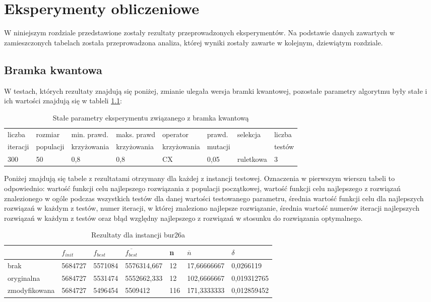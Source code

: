 \chapter{Eksperymenty obliczeniowe}
\label{cha:eksperymenty}
W niniejszym rozdziale przedstawione zostały rezultaty przeprowadzonych eksperymentów. Na podstawie danych zawartych w zamieszczonych tabelach została przeprowadzona analiza, której wyniki zostały zawarte w kolejnym, dziewiątym rozdziale.

\section{Bramka kwantowa}
W testach, których rezultaty znajdują się poniżej, zmianie ulegała wersja bramki kwantowej, pozostałe parametry algorytmu były stałe i ich wartości znajdują się w tableli \ref{T1_params}:

\begin{table}[H]
\label{T1_params}
\begin{tabular}{l l l l l l l l}
\hline
liczba & rozmiar & min. prawd. & maks. prawd & operator & prawd. & selekcja & liczba \\
iteracji & populacji & krzyżowania & krzyżowania & krzyżowania & mutacji & & testów \\
\hline
300 & 50 & 0,8 & 0,8 & CX & 0,05 & ruletkowa & 3 \\
\hline
\end{tabular}
\caption{Stałe parametry eksperymentu związanego z bramka kwantową}
\end{table}

Poniżej znajdują się tabele z rezultatami otrzymany dla każdej z instancji testowej. Oznaczenia w pierwszym wierszu tabeli to odpowiednio: wartość funkcji celu najlepszego rozwiązania z populacji początkowej, wartość funkcji celu najlepszego z rozwiązań znalezionego w ogóle podczas wszystkich testów dla danej wartości testowanego parametru, średnia wartość funkcji celu dla najlepszych rozwiązań w każdym z testów, numer iteracji, w której znaleziono najlepsze rozwiązanie, średnia wartość numerów iteracji najlepszych rozwiązań w każdym z testów oraz błąd względny najlepszego z rozwiązań w stosunku do rozwiązania optymalnego.

\begin{table}[H]
\label{T1_bur26a}
\begin{tabular}{l l l l l l l}
\hline
 & $f_{init}$ & $f_{best}$ & $\overline{f_{best}}$ & n & $\overline{n}$ & $\delta$ \\
\hline
brak & 5684727 & 5571084 & 5576314,667 & 12 & 17,66666667 & 0,0266119 \\
oryginalna & 5684727 & 5531474 & 5552662,333 & 12 & 102,6666667 & 0,019312765 \\
zmodyfikowana & 5684727 & 5496454 & 5509412 & 116 & 171,3333333 & 0,012859452 \\
\hline
\end{tabular}
\caption{Rezultaty dla instancji bur26a}
\end{table}

